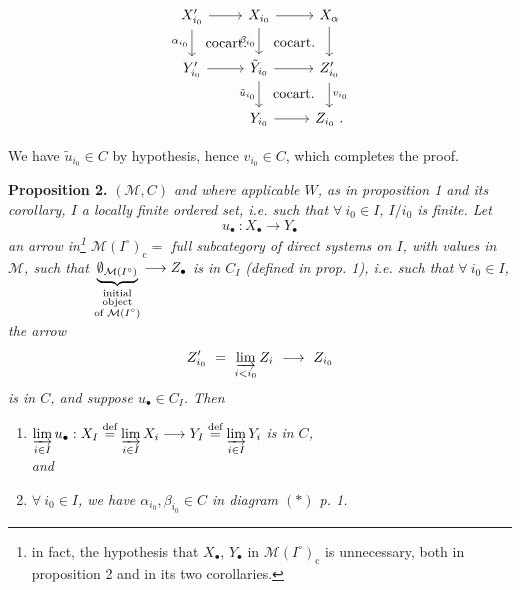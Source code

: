 \documentclass[11pt]{article}
\newcommand{\printedpage}[1]{\marginpar{\footnotesize p.~#1}}
\newcommand{\msp}[1]{\marginpar{\footnotesize [#1]}}
\newcommand{\defeq}{\overset{\textup{def}}{=}}
\newcommand{\cocart}{\textup{cocart.}}
\begin{document}
\setcounter{footnote}{4}

\printedpage{4}

\msp{page 7}

\[
\begin{tikzcd}
X'_{i_0} \arrow[r] \arrow[d, "\alpha_{i_0}"'] \arrow[dr, phantom, "\cocart"] & X_{i_0} \arrow[r] \arrow[d, "\beta_{i_0}"'] \arrow[dr, phantom, "\cocart"] & X_{\alpha} \arrow[d] \\
Y'_{i_0} \arrow[r] & \tilde{Y}_{i_0} \arrow[r] \arrow[d, "\tilde{u}_{i_0}"'] \arrow[dr, phantom, "\cocart"] & Z'_{i_0} \arrow[d, "v_{i_0}"] \\
& Y_{i_0} \arrow[r] & Z_{i_0}\ .
\end{tikzcd}
\]

We have $\tilde{u}_{i_0} \in C$ by hypothesis, hence $v_{i_0} \in C$, which completes the proof.

\textbf{Proposition 2.} \textit{$(\mathcal{M}, C)$ and where applicable $W$, as in proposition 1 and its corollary, $I$ a locally finite ordered set, i.e. such that $\forall\ i_0 \in I$, $I/i_0$ is finite. Let}
\[
u_{\bullet}\ : X_{\bullet} \longrightarrow Y_{\bullet}
\]
\textit{an arrow in\footnote{in fact, the hypothesis that $X_{\bullet}$, $Y_{\bullet}$ in $\mathcal{M}(I^{\circ})_{\mathrm{c}}$ is unnecessary, both in proposition 2 and in its two corollaries.} $\mathcal{M}(I^{\circ})_{\mathrm{c}} =$ full subcategory of direct systems on $I$, with values in $\mathcal{M}$, such that $\underbrace{\emptyset_{\mathcal{M}(I^{\circ})}}_{\substack{\textup{initial}\\ \textup{object}\\ \textup{of } \mathcal{M}(I^{\circ})}} \longrightarrow Z_{\bullet}$ is in $C_I$ (defined in prop. 1), i.e. such that $\forall\ i_0 \in I$, the arrow}
\[
Z'_{i_0} \ = \ \varinjlim_{i < i_0} Z_i \ \longrightarrow \ Z_{i_0}
\]
\textit{is in $C$, and suppose $u_{\bullet} \in C_I$. Then}
\begin{enumerate}
\item[a)] $\varinjlim\limits_{i \in I} u_{\bullet} : X_I \defeq \varinjlim\limits_{i \in I} X_i \longrightarrow Y_I \defeq \varinjlim\limits_{i \in I} Y_i$ \textit{is in $C$,}
\msp{page 8}\\
\textit{and}
\item[b)] \textit{$\forall\ i_0 \in I$, we have $\alpha_{i_0}, \beta_{i_0} \in C$ in diagram $(*)$ p. 1.}
\end{enumerate}
\end{document}
